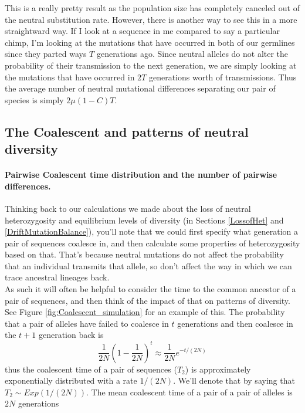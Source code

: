 This is a really pretty result as the population size has completely
canceled out of the neutral substitution rate. However, there is
another way to see this in a more straightward way. If I look at a
sequence in me compared to say a particular chimp, I'm looking at the mutations
that have occurred in both of our germlines since they parted ways $T$
generations ago. Since neutral alleles do not alter the probability
of their transmission to the next generation, we are simply looking at
the mutations that have occurred in $2T$ generations worth of
transmissions. Thus the average number of neutral mutational
differences separating our pair of species is simply $2\mu (1-C) T$.\\


\subsection{The Coalescent and patterns of neutral diversity}

\paragraph{Pairwise Coalescent time distribution and the number of
 pairwise differences.}
Thinking back to our calculations we made about the loss of neutral heterozygosity
and equilibrium levels of diversity (in Sections \ref{LossofHet} and \ref{DriftMutationBalance}), you'll note that we could first specify
what generation a pair of sequences coalesce in, and then calculate
some properties of heterozygosity based on that. That's because neutral
mutations do not affect the probability that an individual transmits
that allele, so don't affect the way in which we can trace ancestral lineages
back. \\

As such it will often be helpful to consider the time to the common
ancestor of a pair of sequences, and then think of the impact of that
on patterns of diversity. See Figure \ref{fig:Coalescent_simulation}
for an example of this. The probability that a pair of alleles
have failed to coalesce in $t$ generations and then coalesce in the
$t+1$ generation back is
\begin{equation}
\frac{1}{2N} (1- \frac{1}{2N} )^{t} \approx \frac{1}{2N} e^{-t/(2N)} \label{eqn:coal_time_dist}
\end{equation}
thus the coalescent time of a pair of sequences ($T_2$) is
approximately exponentially distributed with a rate $1/(2N)$. We'll denote that by
saying that $T_2 \sim Exp \left( 1/(2N) \right)$. The mean coalescent
time of a pair of a pair of alleles is $2N$ generations\\


